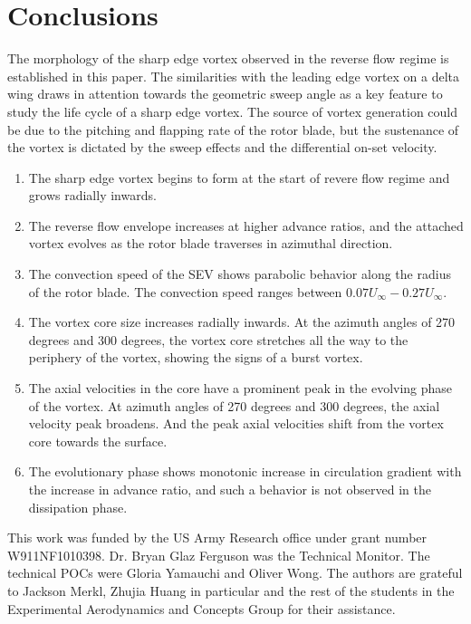 \documentclass[%
 reprint,
 showkeys,
 amsmath,amssymb,
 aps,
]{revtex4-1}
\begin{document}
\section{Conclusions}
The morphology of the sharp edge vortex observed in the reverse flow regime is established in this paper. The similarities with the leading edge vortex on a delta wing draws in attention towards the geometric sweep angle as a key feature to study the life cycle of a sharp edge vortex. The source of vortex generation could be due to the pitching and flapping rate of the rotor blade, but the sustenance of the vortex is dictated by the sweep effects and the differential on-set velocity. 

\begin{enumerate}
    \item The sharp edge vortex begins to form at the start of revere flow regime and grows radially inwards.
    \item The reverse flow envelope increases at higher advance ratios, and the attached vortex evolves as the rotor blade traverses in azimuthal direction. 
    \item The convection speed of the SEV shows parabolic behavior along the radius of the rotor blade. The convection speed ranges between $0.07U_{\infty} - 0.27U_{\infty}$.
    \item The vortex core size increases radially inwards. At the azimuth angles of 270 degrees and 300 degrees, the vortex core stretches all the way to the periphery of the vortex, showing the signs of a burst vortex.  
    \item The axial velocities in the core have a prominent peak in the evolving phase of the vortex. At azimuth angles of 270 degrees and 300 degrees, the axial velocity peak broadens. And the peak axial velocities shift from the vortex core towards the surface.
    \item The evolutionary phase shows monotonic increase in circulation gradient with the increase in advance ratio, and such a behavior is not observed in the dissipation phase. 
\end{enumerate}

\begin{acknowledgements}
	This work was funded by the US Army Research office under grant number W911NF1010398. Dr. Bryan Glaz Ferguson was the Technical Monitor. The technical POCs were Gloria Yamauchi and Oliver Wong. The authors are grateful to Jackson Merkl, Zhujia Huang in particular and the rest of the students in the Experimental Aerodynamics and Concepts Group for their assistance.
	
	
\end{acknowledgements}



\FloatBarrier

\end{document}
